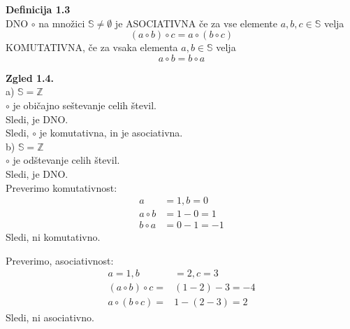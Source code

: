 \documentclass[12pt]{article}
\begin{document}
\vspace*{24pt}


\noindent
\textbf{Definicija 1.3} \\

\noindent
DNO $\circ$ na množici $\mathbb{S} \ne \emptyset$ je ASOCIATIVNA če za vse elemente
$a, b, c \in \mathbb{S}$ velja
$$(a \circ b) \circ c = a \circ (b \circ c)$$
KOMUTATIVNA, če za vsaka elementa $a, b \in \mathbb{S}$ velja
$$a \circ b = b \circ a$$



\vspace*{24pt}


\noindent
\textbf{Zgled 1.4.} \\

\noindent
a) $\mathbb{S} = \mathbb{Z}$ \\
\hspace*{1em} $\circ$ je običajno seštevanje celih števil. \\
\hspace*{1em} Sledi, je DNO. \\
\hspace*{1em} Sledi, $\circ$ je komutativna, in je asociativna. \\

\noindent
b) $\mathbb{S} = \mathbb{Z}$ \\
\hspace*{1em} $\circ$ je odštevanje celih števil. \\
\hspace*{1em} Sledi, je DNO. \\
\hspace*{1em} Preverimo komutativnost:
\begin{align*}
    a &= 1, b = 0 \\
    a \circ b &= 1 - 0 = 1 \\
    b \circ a &= 0 - 1 = -1    
\end{align*}
\hspace*{1em} Sledi, ni komutativno.

\noindent
\hspace*{1em} Preverimo, asociativnost:
\begin{align*}
    a = 1, b &= 2, c = 3 \\
    (a \circ b) \circ c = & (1 - 2) - 3 = -4 \\
    a \circ (b \circ c) = & 1 - (2 - 3) = 2
\end{align*}
\hspace*{1em} Sledi, ni asociativno. \\
\end{document}
